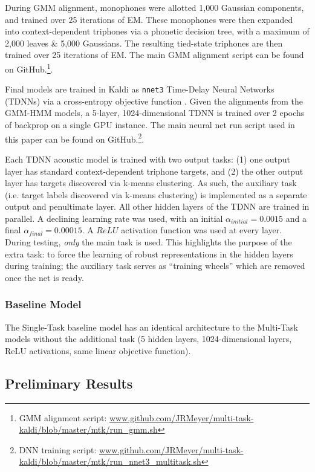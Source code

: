 \documentclass[a4paper]{article}
\begin{document}
During GMM alignment, monophones were allotted 1,000 Gaussian components, and trained over 25 iterations of EM. These monophones were then expanded into context-dependent triphones via a phonetic decision tree, with a maximum of 2,000 leaves \& 5,000 Gaussians. The resulting tied-state triphones are then trained over 25 iterations of EM. The main GMM alignment script can be found on GitHub.\footnote{GMM alignment script: \url{www.github.com/JRMeyer/multi-task-kaldi/blob/master/mtk/run_gmm.sh}}.

Final models are trained in Kaldi as \texttt{nnet3} Time-Delay Neural Networks (TDNNs) via a cross-entropy objective function \cite{povey2011,peddinti2015}. Given the alignments from the GMM-HMM models, a 5-layer, 1024-dimensional TDNN is trained over 2 epochs of backprop on a single GPU instance. The main neural net run script used in this paper can be found on GitHub.\footnote{DNN training script: \url{www.github.com/JRMeyer/multi-task-kaldi/blob/master/mtk/run_nnet3_multitask.sh}}.

Each TDNN acoustic model is trained with two output tasks: (1) one output layer has standard context-dependent triphone targets, and (2) the other output layer has targets discovered via k-means clustering. As such, the auxiliary task (i.e. target labels discovered via k-means clustering) is implemented as a separate output and penultimate layer. All other hidden layers of the TDNN are trained in parallel. A declining learning rate was used, with an initial $\alpha_{initial}=0.0015$ and a final $\alpha_{final}=0.00015$. A $ReLU$ activation function was used at every layer. During testing, \textit{only} the main task is used. This highlights the purpose of the extra task: to force the learning of robust representations in the hidden layers during training; the auxiliary task serves as ``training wheels'' which are removed once the net is ready.


\subsubsection{Baseline Model}

The Single-Task baseline model has an identical architecture to the Multi-Task models without the additional task (5 hidden layers, 1024-dimensional layers, ReLU activations, same linear objective function).



\subsection{Preliminary Results}
\end{document}
